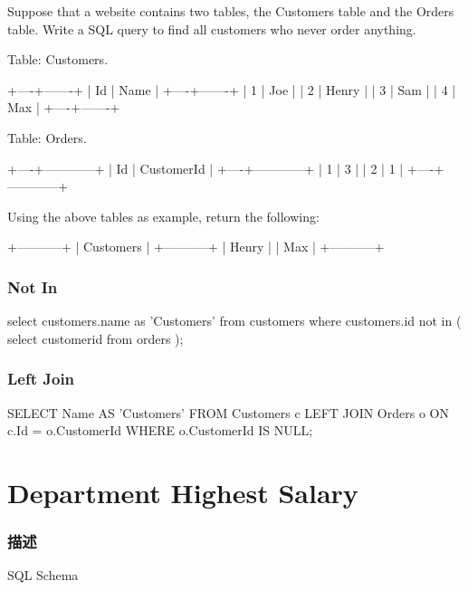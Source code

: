 Suppose that a website contains two tables, the Customers table and the Orders table. Write a SQL query to find all customers who never order anything.

Table: Customers.
\begin{Code}
+----+-------+
| Id | Name  |
+----+-------+
| 1  | Joe   |
| 2  | Henry |
| 3  | Sam   |
| 4  | Max   |
+----+-------+
\end{Code}

Table: Orders.

\begin{Code}
+----+------------+
| Id | CustomerId |
+----+------------+
| 1  | 3          |
| 2  | 1          |
+----+------------+
\end{Code}

Using the above tables as example, return the following:

\begin{Code}
+-----------+
| Customers |
+-----------+
| Henry     |
| Max       |
+-----------+
\end{Code}

\subsubsection{Not In}
\begin{Code}
select customers.name as 'Customers'
from customers
where customers.id not in
(
    select customerid from orders
);
\end{Code}

\subsubsection{Left Join}
\begin{Code}
SELECT Name AS 'Customers'
FROM Customers c
LEFT JOIN Orders o
ON c.Id = o.CustomerId
WHERE o.CustomerId IS NULL;
\end{Code}

\section{Department Highest Salary} %
\label{sec:department-highest-salary}


\subsubsection{描述}
SQL Schema

